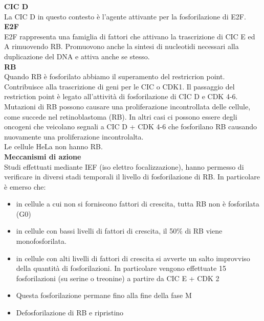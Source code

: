             \textbf{CIC D}\\
                La CIC D in questo contesto è l'agente attivante per la fosforilazione di E2F.\\
            
            \textbf{E2F}\\
                E2F rappresenta una famiglia di fattori che attivano la trascrizione di CIC E ed A rimuovendo RB. Promuovono anche la sintesi di nucleotidi necessari alla duplicazione del DNA e attiva anche se stesso.\\
            
            \textbf{RB}\\
                Quando RB è fosforilato abbiamo il superamento del restricrion point. Contribuisce alla trascrizione di geni per le CIC o CDK1. Il passaggio del restriction point è legato all'attività di fosforilazione di CIC D e CDK 4-6.\\
                Mutazioni di RB possono causare una proliferazione incontrollata delle cellule, come succede nel retinoblastoma (RB). In altri casi ci possono essere degli oncogeni che veicolano segnali a CIC D + CDK 4-6 che fosforilano RB causando nuovamente una proliferazione incontrolalta.\\
                Le cellule HeLa non hanno RB.\\
            
            \textbf{Meccanismi di azione}\\
                Studi effettuati mediante IEF (iso elettro focalizzazione), hanno permesso di verificare in diversi stadi temporali il livello di fosforilazione di RB. In particolare è emerso che:
                \begin{itemize}
                    \item in cellule a cui non si forniscono fattori di crescita, tutta RB non è fosforilata (G0)
                    \item in cellule con bassi livelli di fattori di crescita, il 50\% di RB viene monofosforilata.
                    \item in cellule con alti livelli di fattori di crescita si avverte un salto improvviso della quantità di fosforilazioni. In particolare vengono effettuate 15 fosforilazioni (su serine o treonine) a partire da CIC E + CDK 2
                    \item Questa fosforilazione permane fino alla fine della fase M
                    \item Defosforilazione di RB e ripristino
                \end{itemize}
                
